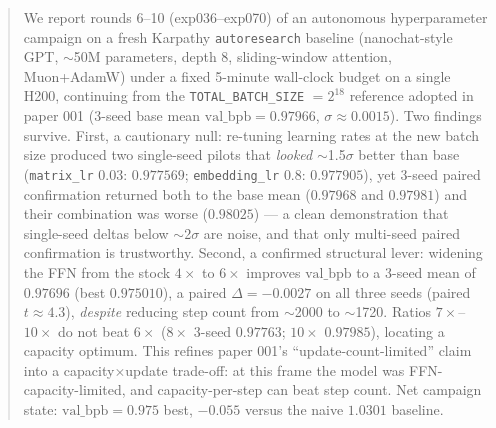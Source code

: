 \documentclass{article}
\newcommand{\valbpb}{\mathrm{val\_bpb}}
\begin{document}

\printAffiliationsAndNotice{}

\begin{abstract}
We report rounds 6--10 (exp036--exp070) of an autonomous hyperparameter campaign on a fresh Karpathy \texttt{autoresearch} baseline (nanochat-style GPT, $\sim$50M parameters, depth 8, sliding-window attention, Muon+AdamW) under a fixed 5-minute wall-clock budget on a single H200, continuing from the \texttt{TOTAL\_BATCH\_SIZE} $=2^{18}$ reference adopted in paper 001 (3-seed base mean $\valbpb = 0.97966$, $\sigma \approx 0.0015$). Two findings survive. First, a cautionary null: re-tuning learning rates at the new batch size produced two single-seed pilots that \emph{looked} $\sim$1.5$\sigma$ better than base (\texttt{matrix\_lr} $0.03$: $0.977569$; \texttt{embedding\_lr} $0.8$: $0.977905$), yet 3-seed paired confirmation returned both to the base mean ($0.97968$ and $0.97981$) and their combination was worse ($0.98025$) --- a clean demonstration that single-seed deltas below $\sim$2$\sigma$ are noise, and that only multi-seed paired confirmation is trustworthy. Second, a confirmed structural lever: widening the FFN from the stock $4\times$ to $6\times$ improves $\valbpb$ to a 3-seed mean of $0.97696$ (best $0.975010$), a paired $\Delta = -0.0027$ on all three seeds (paired $t \approx 4.3$), \emph{despite} reducing step count from $\sim$2000 to $\sim$1720. Ratios $7\times$--$10\times$ do not beat $6\times$ ($8\times$ 3-seed $0.97763$; $10\times$ $0.97985$), locating a capacity optimum. This refines paper 001's ``update-count-limited'' claim into a capacity$\times$update trade-off: at this frame the model was FFN-capacity-limited, and capacity-per-step can beat step count. Net campaign state: $\valbpb = 0.975$ best, $-0.055$ versus the naive $1.0301$ baseline.
\end{abstract}
\end{document}
